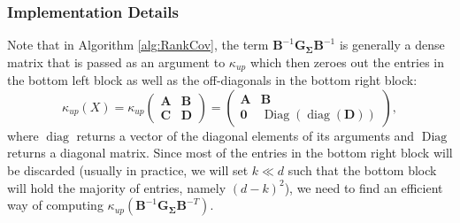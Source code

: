 \documentclass[a4paper, 11pt, oneside]{scrartcl}
\theoremstyle{break}
\DeclareMathOperator{\diag}{diag}
\DeclareMathOperator{\Diag}{Diag}
\newcommand{\matr}[1]{\boldsymbol{#1}}
\numberwithin{equation}{section}
\begin{document}
				\subsubsection{Implementation Details}
					Note that in Algorithm \ref{alg:RankCov}, the term $\matr{B}^{-1} \matr{G_{\Sigma}} \matr{B}^{-1}$ is generally a dense matrix that is passed as an argument to $\kappa_{up}$ which then zeroes out the entries in the bottom left block as well as the off-diagonals in the bottom right block:
					$$\kappa_{up}(X) = \kappa_{up} \begin{pmatrix} \matr{A} & \matr{B} \\ \matr{C} & \matr{D} \end{pmatrix} = \begin{pmatrix} \matr{A} & \matr{B} \\ \matr{0} & \Diag(\diag (\matr{D}))\end{pmatrix},$$
					where $\diag$ returns a vector of the diagonal elements of its arguments and $\Diag$ returns a diagonal matrix.
					Since most of the entries in the bottom right block will be discarded (usually in practice, we will set $k \ll d$ such that the bottom block will hold the majority of entries, namely $(d - k)^2$), we need to find an efficient way of computing $\kappa_{up}(\matr{B}^{-1} \matr{G_{\Sigma}} \matr{B}^{-T})$.
\end{document}
